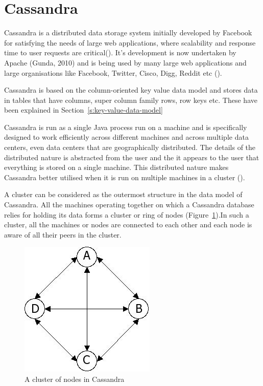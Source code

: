 \section{Cassandra} \label{s:Cassandra}

Cassandra is a distributed data storage system initially developed by Facebook
 for satisfying the needs of large web applications, where
scalability and response time to user requests are critical().
It's development is now undertaken by Apache (Gunda, 2010) and is being used by
many large web applications and large organisations like Facebook, Twitter,
Cisco, Digg, Reddit etc ().

Cassandra is based on the column-oriented key value data model and stores data
in tables that have columns, super column family rows, row keys etc.
These have been explained in Section~\ref{s:key-value-data-model}

Cassandra is run as a single Java process run on a machine and is specifically
designed to work efficiently across different machines and across multiple data
centers, even data centers that are geographically distributed. The details of
the distributed nature is abstracted from  the user and the it appears to the
user that everything is stored on a single machine. This distributed nature
makes Cassandra better utilised when it is run on multiple machines in a cluster
().

A cluster can be considered as the outermost structure in the data model of
Cassandra. All the machines operating together on which a Cassandra database
relies for holding its data  forms a cluster or ring of nodes
(Figure~\ref{f:cluster}).In such a cluster, all the machines or nodes are
connected to each other and each node is aware of all their peers in the
cluster.

\begin{figure}[h] \centering
\includegraphics[width=.3\textwidth]{./figure/Cassandra/Cassandra-cluster.png}
	\caption{A cluster of nodes in Cassandra}\label{f:cluster}
\end{figure}

